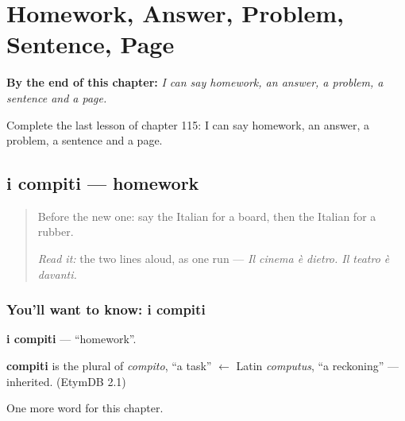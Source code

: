 
\chapter{Homework, Answer, Problem, Sentence, Page}
\label{ch:it-homework-answer-problem-sentence-page}

\begin{chapteropening}
\textbf{By the end of this chapter:} \emph{I can say homework, an answer, a problem, a sentence and a page.}

Complete the last lesson of chapter 115: I can say homework, an answer, a problem, a sentence and a page.
\end{chapteropening}

\section[i compiti]{i compiti — homework}

\label{lesson:IT-C115-compiti}



\begin{quote}
Before the new one: say the Italian for a board, then the Italian for a rubber.

\emph{Read it:} the two lines aloud, as one run — \emph{Il cinema è dietro. Il teatro è davanti.}
\end{quote}

\subsection*{You'll want to know: i compiti}
\textbf{i compiti} — \textquotedblleft{}homework\textquotedblright{}.

\begin{cousinweb}
\textbf{compiti} is the plural of \emph{compito}, \textquotedblleft{}a task\textquotedblright{} $\leftarrow$ Latin \emph{computus}, \textquotedblleft{}a reckoning\textquotedblright{} — inherited. (EtymDB 2.1)
\end{cousinweb}

\begin{grammarlens}[title={What you've built}]
One more word for this chapter.
\end{grammarlens}

